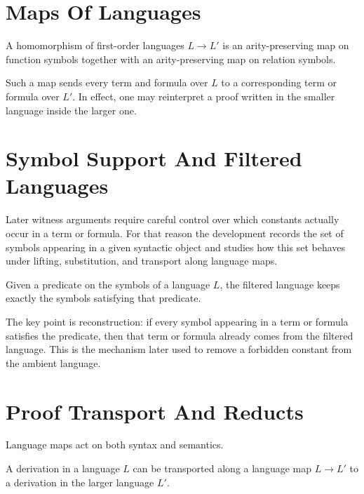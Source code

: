 \section{Maps Of Languages}

\begin{definition}
\label{def:language-hom}
A homomorphism of first-order languages $L \to L'$ is an arity-preserving map
on function symbols together with an arity-preserving map on relation symbols.
\end{definition}

Such a map sends every term and formula over $L$ to a corresponding term or
formula over $L'$. In effect, one may reinterpret a proof written in the
smaller language inside the larger one.

\section{Symbol Support And Filtered Languages}

Later witness arguments require careful control over which constants actually
occur in a term or formula. For that reason the development records the set of
symbols appearing in a given syntactic object and studies how this set behaves
under lifting, substitution, and transport along language maps.

\begin{definition}
\label{def:filtered-language}
Given a predicate on the symbols of a language $L$, the filtered language keeps
exactly the symbols satisfying that predicate.
\end{definition}

The key point is reconstruction: if every symbol appearing in a term or formula
satisfies the predicate, then that term or formula already comes from the
filtered language. This is the mechanism later used to remove a forbidden
constant from the ambient language.

\section{Proof Transport And Reducts}

Language maps act on both syntax and semantics.

\begin{proposition}
\label{prop:on-prf}
A derivation in a language $L$ can be transported along a language map
$L \to L'$ to a derivation in the larger language $L'$.
\end{proposition}

